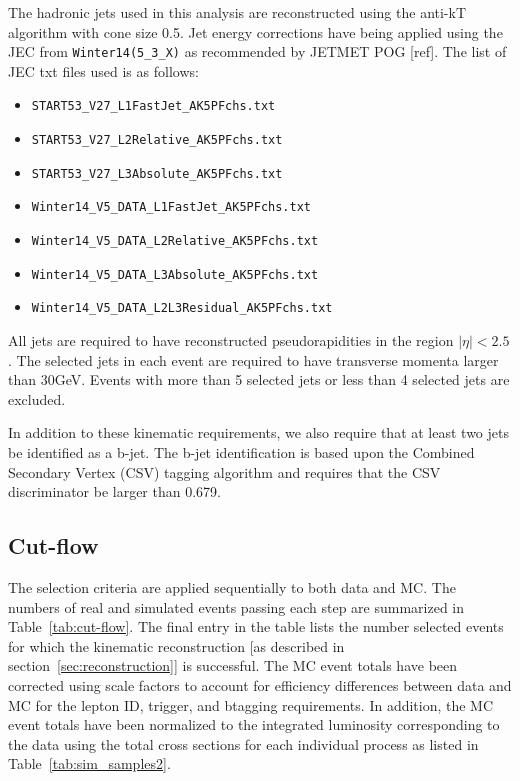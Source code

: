 \documentclass{cmspaperpdf}
\begin{document}
The hadronic jets used in this analysis are reconstructed using the anti-kT algorithm with cone size 0.5. Jet energy corrections have being applied using the JEC from \texttt{Winter14(5\_3\_X)} as recommended by JETMET POG [ref]. The list of JEC txt files used is as follows:
\begin{itemize}
\item \texttt{START53\_V27\_L1FastJet\_AK5PFchs.txt}
\item \texttt{START53\_V27\_L2Relative\_AK5PFchs.txt}
\item \texttt{START53\_V27\_L3Absolute\_AK5PFchs.txt}
\item \texttt{Winter14\_V5\_DATA\_L1FastJet\_AK5PFchs.txt}
\item \texttt{Winter14\_V5\_DATA\_L2Relative\_AK5PFchs.txt}
\item \texttt{Winter14\_V5\_DATA\_L3Absolute\_AK5PFchs.txt}
\item \texttt{Winter14\_V5\_DATA\_L2L3Residual\_AK5PFchs.txt}
\end{itemize}  

All jets are required to have reconstructed pseudorapidities in the region $|\eta|<2.5$.  The selected jets in each event are required to have transverse momenta larger than 30GeV. Events with more than 5 selected jets or less than 4 selected jets are excluded. 

In addition to these kinematic requirements, we also require that at least two jets be identified as a b-jet.  The b-jet identification is based upon the Combined Secondary Vertex (CSV) tagging algorithm \cite{CSV_note} and requires that the CSV discriminator be larger than 0.679.

\subsection{Cut-flow}

The selection criteria are applied sequentially to both data and MC.  The numbers of real and simulated events passing each step are summarized in Table~\ref{tab:cut-flow}.  The final entry in the table lists the number selected events for which the kinematic reconstruction [as described in section~\ref{sec:reconstruction}] is successful. The MC event totals have been corrected using scale factors to account for efficiency differences between data and MC for the lepton ID, trigger, and btagging requirements. In addition, the MC event totals have been normalized to the integrated luminosity corresponding to the data using the total cross sections for each individual process as listed in Table~\ref{tab:sim_samples2}. 
\end{document}
